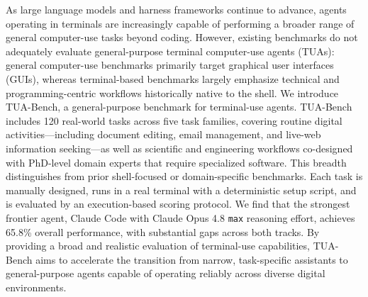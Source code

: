 As large language models and harness frameworks continue to advance, agents operating in terminals are increasingly capable of performing a broader range of general computer-use tasks beyond coding. However, existing benchmarks do not adequately evaluate general-purpose terminal computer-use agents (TUAs): general computer-use benchmarks primarily target graphical user interfaces (GUIs), whereas terminal-based benchmarks largely emphasize technical and programming-centric workflows historically native to the shell. 
We introduce TUA-Bench, a general-purpose benchmark for terminal-use agents. TUA-Bench includes 120 real-world tasks across five task families, covering routine digital activities—including document editing, email management, and live-web information seeking—as well as scientific and engineering workflows co-designed with PhD-level domain experts that require specialized software. This breadth distinguishes \benchname from prior shell-focused or domain-specific benchmarks. Each task is manually designed, runs in a real terminal with a deterministic setup script, and is evaluated by an execution-based scoring protocol. We find that the strongest frontier agent, Claude Code with Claude Opus 4.8 \texttt{max} reasoning effort, achieves 65.8\% overall performance, with substantial gaps across both tracks. By providing a broad and realistic evaluation of terminal-use capabilities, TUA-Bench aims to accelerate the transition from narrow, task-specific assistants to general-purpose agents capable of operating reliably across diverse digital environments.
